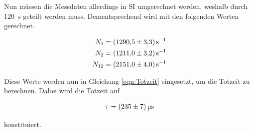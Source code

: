 \noindent Nun müssen die Messdaten allerdings in SI umgerechnet werden, weshalb durch \qty{120}{\second} geteilt werden muss. 
Dementsprechend wird mit den folgenden Werten gerechnet.

\begin{align*}
    N_{1 } &= \qty[per-mode=reciprocal]{1290.5\pm3.3}{\per\second}    \\
    N_{2 } &= \qty[per-mode=reciprocal]{1211.0\pm3.2}{\per\second}    \\
    N_{12} &= \qty[per-mode=reciprocal]{2151.0\pm4.0}{\per\second}    \\
\end{align*}

\noindent Diese Werte werden nun in Gleichung \eqref{eqn:Totzeit} eingesetzt, um die Totzeit zu berechnen. Dabei wird die Totzeit auf

\begin{align*}
    \tau = \qty{235\pm7}{\micro \second}
\end{align*}

\noindent konstituiert.












